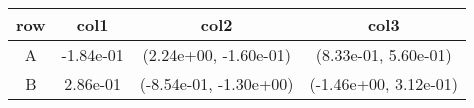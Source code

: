 \begin{tabular}{cccc}
\toprule
row&col1&col2&col3\tabularnewline
\midrule
A&-1.84e-01& (2.24e+00, -1.60e-01)& (8.33e-01, 5.60e-01)\tabularnewline
B&2.86e-01& (-8.54e-01, -1.30e+00)& (-1.46e+00, 3.12e-01)\tabularnewline
\bottomrule
\end{tabular}
